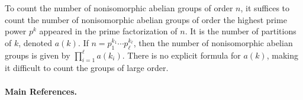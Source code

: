 \begin{remark}
	To count the number of nonisomorphic abelian groups of order $n$, it suffices to count the number of nonisomorphic abelian groups of order the highest prime power $p^k$ appeared in the prime factorization of $n$. It is the number of partitions of $k$, denoted $a(k)$. If $n = p_1^{k_1}\cdots p_\ell^{k_\ell}$, then the number of nonisomorphic abelian groups is given by
	$
		\prod_{i=1}^\ell a(k_i)
	$. There is no explicit formula for $a(k)$, making it difficult to count the groups of large order.
\end{remark}

\paragraph{Main References.} \cite{Lang2002,Hungerford1974,Kaplansky1954,Kaplansky1977,Robinson1982}
